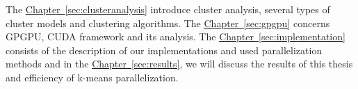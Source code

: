 

The \hyperref[sec:clusteranalysis]{Chapter~\ref*{sec:clusteranalysis}} introduce cluster analysis, several types of cluster models and clustering algorithms. The \hyperref[sec:gpgpu]{Chapter~\ref*{sec:gpgpu}} concerns GPGPU, CUDA framework and its analysis. The \hyperref[sec:implementation]{Chapter~\ref*{sec:implementation}} consists of the description of our implementations and used parallelization methods and in the \hyperref[sec:results]{Chapter~\ref*{sec:results}}, we will discuss the results of this thesis and efficiency of k-means parallelization. 